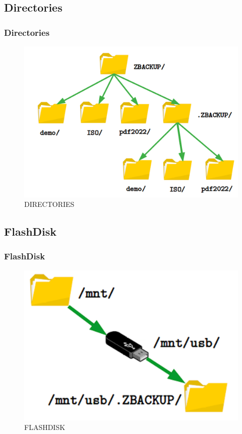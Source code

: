 \documentclass[xcolor=table, notheorems, hyperref={pdfpagelabels=false}]{beamer}
\begin{document}
\begin{frame}[fragile]
\section{Directories}
\frametitle{Directories}
\begin{figure}
\includegraphics[width=0.69\linewidth]{DIRECTORIES}
\caption{DIRECTORIES}
\end{figure}
\end{frame}

\begin{frame}[fragile]
\section{FlashDisk}
\frametitle{FlashDisk}
\begin{figure}
\includegraphics[width=0.69\linewidth]{FLASHDISK}
\caption{FLASHDISK}
\end{figure}
\end{frame}

\end{document}
